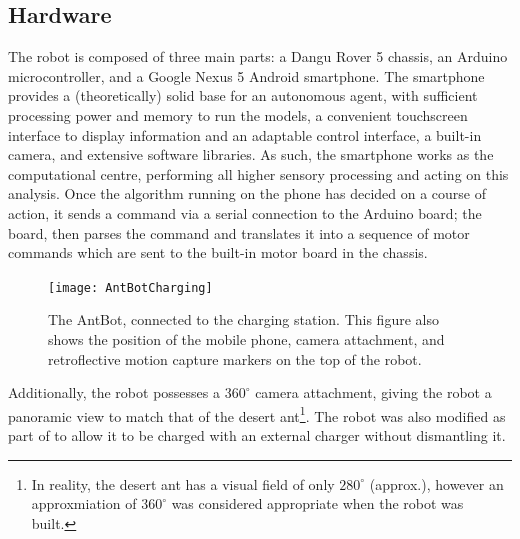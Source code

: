 \documentclass[a4paper,11pt,twoside,openright]{article}
\begin{document}
\subsection{ Hardware }
The robot is composed of three main parts: a Dangu Rover 5 chassis, an
Arduino microcontroller, and a Google Nexus 5 Android smartphone. The
smartphone provides a (theoretically) solid base for an autonomous
agent, with sufficient processing power and memory to run the models,
a convenient touchscreen interface to display information and an
adaptable control interface, a built-in camera, and extensive software
libraries. As such, the smartphone works as the computational centre,
performing all higher sensory processing and acting on this analysis.
Once the algorithm running on the phone has decided on a course of
action, it sends a command via a serial connection to the Arduino
board; the board, then parses the command and translates it into a
sequence of motor commands which are sent to the built-in motor board
in the chassis.\newline\par
\begin{figure}[h!]
  \centering
  \texttt{[image: AntBotCharging]}
  \caption{
    \label{fig:antbotcomp} The AntBot, connected to the charging station.
    This figure also shows the position of the mobile phone, camera attachment,
    and retroflective motion capture markers on the top of the robot.
    }
\end{figure}

Additionally, the robot possesses a $360^{\circ}$ camera attachment,
giving the robot a panoramic view to match that of the desert
ant\footnote{In reality, the desert ant has a visual field of only
  $280^{\circ}$ (approx.)\cite{Ardin2016}, however an approxmiation of
  $360^{\circ}$ was considered appropriate when the robot was
  built.}. The robot was also modified as part of \cite{Mitchell2018}
to allow it to be charged with an external charger without dismantling
it.
\end{document}
